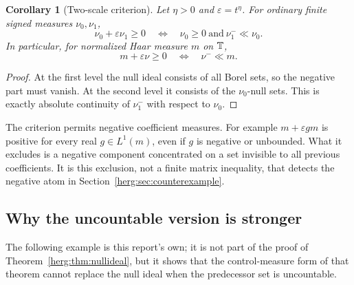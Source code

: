 \documentclass[11pt,letterpaper]{article}
\newtheorem{corollary}[theorem]{Corollary}
\theoremstyle{definition}
\newcommand{\eps}{\varepsilon}
\numberwithin{equation}{section}
\begin{document}
\begin{corollary}[Two-scale criterion]\label{herg:cor:twoscale}
Let $\eta>0$ and $\eps=t^\eta$. For ordinary finite signed measures $\nu_0,\nu_1$,
\begin{equation}\label{herg:eq:twoscale}
 \nu_0+\eps\nu_1\ge0
 \quad\Longleftrightarrow\quad
 \nu_0\ge0\ \text{and}\ \nu_1^-\ll\nu_0.
\end{equation}
In particular, for normalized Haar measure $m$ on $\mathbb T$,
\[
 m+\eps\nu\ge0\quad\Longleftrightarrow\quad\nu^-\ll m.
\]
\end{corollary}
\begin{proof}
At the first level the null ideal consists of all Borel sets, so the negative part must vanish. At the second level it consists of the $\nu_0$-null sets. This is exactly absolute continuity of $\nu_1^-$ with respect to $\nu_0$.
\end{proof}

The criterion permits negative coefficient measures. For example $m+\eps g m$ is positive for every real $g\in L^1(m)$, even if $g$ is negative or unbounded. What it excludes is a negative component concentrated on a set invisible to all previous coefficients. It is this exclusion, not a finite matrix inequality, that detects the negative atom in Section~\ref{herg:sec:counterexample}.

\subsection{Why the uncountable version is stronger}

The following example is this report's own; it is not part of the proof of Theorem~\ref{herg:thm:nullideal}, but it shows that the control-measure form of that theorem cannot replace the null ideal when the predecessor set is uncountable.
\end{document}

